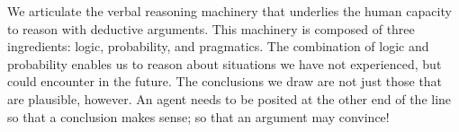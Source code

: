 \documentclass[floatsintext, doc]{apa6}
\newcommand{\mht}[1]{{\textcolor{Blue}{[mht: #1]}}}
\begin{document}

We articulate the verbal reasoning machinery that underlies the human capacity to reason with deductive arguments. 
This machinery is composed of three ingredients: logic, probability, and pragmatics. 
The combination of logic and probability enables us to reason about situations we have not experienced, but could encounter in the future.
The conclusions we draw are not just those that are plausible, however.
An agent needs to be posited at the other end of the line so that a conclusion makes sense; so that an argument may convince!

%
%



 
\end{document}
